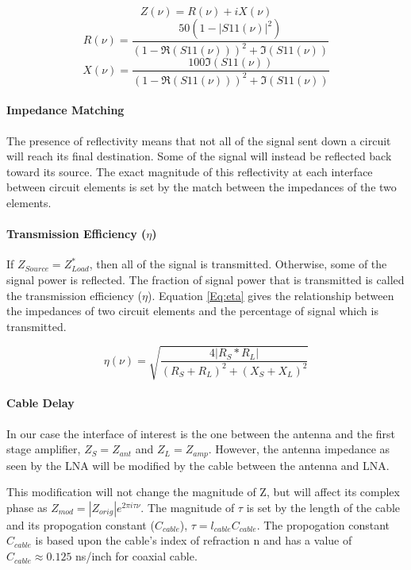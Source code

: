 \begin{equation}\label{Eq:Imp_calc}
Z(\nu) = R(\nu)+ i X(\nu) 
\end{equation}
\begin{equation}
R(\nu) = \frac{50 (1-|S11(\nu)|^2)}{(1-\Re(S11(\nu)))^2 + \Im(S11(\nu))} 
\end{equation}
\begin{equation}
X(\nu) = \frac{100 \Im(S11(\nu))}{(1-\Re(S11(\nu)))^2 + \Im(S11(\nu))} 
\end{equation}

\paragraph{Impedance Matching}

The presence of reflectivity means that not all of the signal sent down a circuit will reach its final destination. Some of the signal will instead be reflected back toward its source. The exact magnitude of this reflectivity at each interface between circuit elements is set by the match between the impedances of the two elements. 

\paragraph{Transmission Efficiency ($\eta$)}

If $Z_{Source} = Z^*_{Load}$, then all of the signal is transmitted. Otherwise, some of the signal power is reflected. The fraction of signal power that is transmitted is called the transmission efficiency ($\eta$). Equation \ref{Eq:eta} gives the relationship between the impedances of two circuit elements and the percentage of signal which is transmitted. 

\begin{equation} \label{Eq:eta}
\eta (\nu) = \sqrt{\frac{4 |R_{S}*R_{L}|}{(R_{S}+R_{L})^2+(X_{S}+X_{L})^2}}
\end{equation}

\paragraph{Cable Delay}

In our case the interface of interest is the one between the antenna and the first stage amplifier, $Z_S = Z_{ant}$ and $Z_L = Z_{amp}$. However, the antenna impedance as seen by the LNA will be modified by the cable between the antenna and LNA. 

This modification will not change the magnitude of Z, but will affect its complex phase as $Z_{mod} = |Z_{orig}| e^{2 \pi i \tau \nu }$. The magnitude of $\tau$ is set by the length of the cable and its propogation constant ($C_{cable}$), $\tau = l_{cable} C_{cable}$. The propogation constant $C_{cable}$ is based upon the cable's index of refraction n and has a value of $C_{cable} \approx 0.125$ ns/inch for coaxial cable. 

